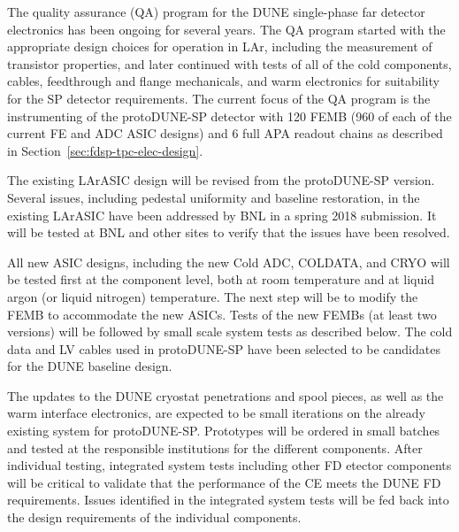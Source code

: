 The quality assurance (QA) program for the DUNE single-phase far detector electronics has been ongoing for several years.  The QA program started with the appropriate design choices for operation
in LAr, including the measurement of transistor properties, and later
continued with tests of all of the cold components, cables, feedthrough and flange mechanicals, and warm electronics for suitability for the SP detector requirements.  The current focus of the QA program is the instrumenting of the protoDUNE-SP detector with 120 FEMB (960 of each of the current FE and ADC ASIC designs) and 6 full APA readout chains as described in Section~\ref{sec:fdsp-tpc-elec-design}.

The existing LArASIC design will be revised from the protoDUNE-SP version. Several issues, 
including pedestal uniformity and baseline restoration, in the existing LArASIC have been 
addressed by BNL in a spring 2018 submission. It will be tested at BNL and other sites to 
verify that the issues have been resolved. 

All new ASIC designs, including the new Cold ADC, COLDATA, and CRYO will be tested first at the component level, both at room temperature and at liquid argon (or liquid nitrogen) temperature. The next step will be to modify the FEMB to accommodate the new ASICs.  Tests of the new FEMBs (at least two versions) will be followed by small scale system tests as described below.  The cold data and LV cables used in protoDUNE-SP have been selected to be candidates for the DUNE baseline design.%

The updates to the DUNE cryostat penetrations and spool pieces, as well as the warm interface electronics, are expected to be small iterations on the already existing system for protoDUNE-SP.  Prototypes will be ordered in small batches and tested at the responsible institutions for the different components.  After individual testing, integrated system tests including other FD etector components will be critical to validate that the performance of the CE meets the DUNE FD requirements.  Issues identified in the integrated system tests will be fed back into the design requirements of the individual components.
